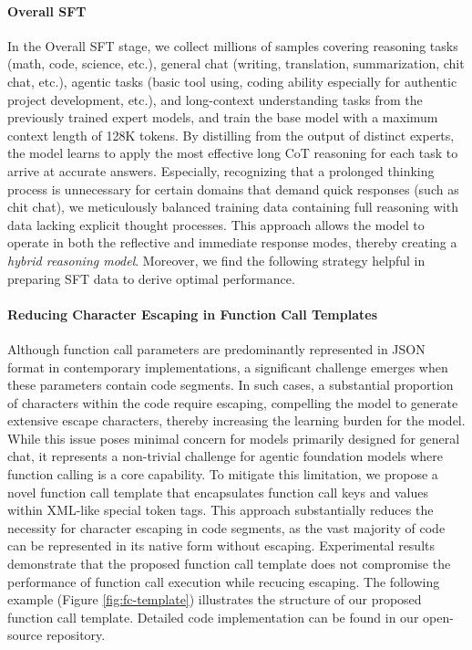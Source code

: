 \paragraph{Overall SFT} In the Overall SFT stage, we collect millions of samples covering reasoning tasks (math, code, science, etc.), general chat (writing, translation, summarization, chit chat, etc.), agentic tasks (basic tool using, coding ability especially for authentic project development, etc.), and long-context understanding tasks from the previously trained expert models, and train the base model with a maximum context length of 128K tokens. By distilling from the output of distinct experts, the model learns to apply the most effective long CoT reasoning for each task to arrive at accurate answers. Especially, recognizing that a prolonged thinking process is unnecessary for certain domains that demand quick responses (such as chit chat), we meticulously balanced training data containing full reasoning with data lacking explicit thought processes. This approach allows the model to operate in both the reflective and immediate response modes, thereby creating a \emph{hybrid reasoning model}. Moreover, we find the following strategy helpful in preparing SFT data to derive optimal performance.

\paragraph{Reducing Character Escaping in Function Call Templates} Although function call parameters are predominantly represented in JSON format in contemporary implementations, a significant challenge emerges when these parameters contain code segments. In such cases, a substantial proportion of characters within the code require escaping, compelling the model to generate extensive escape characters, thereby increasing the learning burden for the model. While this issue poses minimal concern for models primarily designed for general chat, it represents a non-trivial challenge for agentic foundation models where function calling is a core capability.
To mitigate this limitation, we propose a novel function call template that encapsulates function call keys and values within XML-like special token tags. This approach substantially reduces the necessity for character escaping in code segments, as the vast majority of code can be represented in its native form without escaping. Experimental results demonstrate that the proposed function call template does not compromise the performance of function call execution while recucing escaping. The following example (Figure \ref{fig:fc-template}) illustrates the structure of our proposed function call template. Detailed code implementation can be found in our open-source repository.

